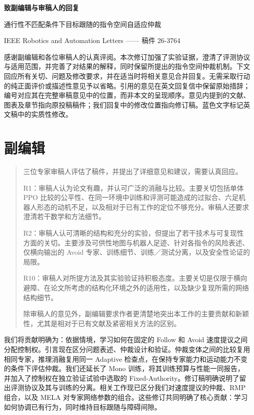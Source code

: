 \begin{center}
{\LARGE\bfseries 致副编辑与审稿人的回复}\par
{\large 通行性不匹配条件下目标跟随的指令空间自适应仲裁}\par
IEEE Robotics and Automation Letters —— 稿件 26-3764
\end{center}
感谢副编辑和各位审稿人的认真评阅。本次修订加强了实验证据，澄清了评测协议与适用范围，并完善了对结果的解释，同时保留所提出的指令空间仲裁机制。下文回应所有关切、问题及修改要求，并在适当时将相关意见合并回复。无需采取行动的纯正面评价或描述性意见予以省略。引用的意见在英文回复信中保留原始措辞；编号对应其在完整审稿意见中的位置，而非本文的呈现顺序。意见内提到的文献、图表及章节指向原投稿稿件；我们回复中的修改位置指向修订稿。蓝色文字标记英文稿中的实质性修改。

\section*{副编辑}
\begin{quote}
三位专家审稿人评估了稿件，并提出了详细意见和建议，需要认真回应。

R1：审稿人认为论文有趣，并认可广泛的消融与比较。主要关切包括单体 PPO 比较的公平性、在同一环境中训练和评测可能造成的过拟合、六足机器人形态的动机不足，以及相对于已有工作的定位不够充分。审稿人还要求澄清若干数学和方法细节。

R2：审稿人认可清晰的结构和充分的实验，但提出了若干技术与可复现性方面的关切。主要涉及可供性地图与机器人足迹、针对各指令的风险表述、仅横向输出的 Avoid 专家、训练细节、训练／测试分离，以及安全性论证的局限。

R10：审稿人对所提方法及其实验验证持积极态度。主要关切是仅限于横向避障、在论文所考虑的结构化环境之外的适用性，以及缺少复现所需的网络结构细节。

除审稿人的意见外，副编辑要求作者更清楚地突出本工作的主要贡献和新颖性，尤其是相对于已有文献及紧密相关方法的区别。
\end{quote}
\response
我们将贡献明确为：依据情境，学习如何在固定的 Follow 和 Avoid 速度提议之间分配控制权。引言现在区分问题表述、仲裁设计和验证。仲裁变体之间的比较复用相同专家，推理消融复用同一 Adaptive 检查点，在保持专家能力和运动能力不变的条件下评估仲裁。我们还延长了 Mono 训练，将其训练预算与性能一同报告，并加入了控制权在独立验证试验中选取的 Fixed-Authority。修订稿明确说明了留出评测协议及其与训练的分离。相关工作现已区分我们对速度提议的仲裁、RMP 组合，以及 MELA 对专家网络参数的组合。这些修订共同明确了核心贡献：学习如何协调已有行为，同时维持目标跟随与障碍间隙。

